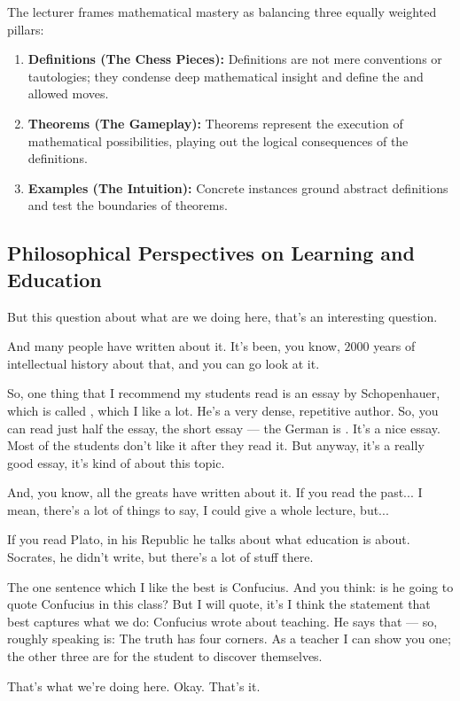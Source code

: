 \begin{content}
\begin{steps}
The lecturer frames mathematical mastery as balancing three equally weighted pillars:
\begin{enumerate}[label=\textbf{(\arabic*)}]
    \item \textbf{Definitions (The Chess Pieces):} Definitions are not mere conventions or tautologies; they condense deep mathematical insight and define the  and allowed moves.
    \item \textbf{Theorems (The Gameplay):} Theorems represent the execution of mathematical possibilities, playing out the logical consequences of the definitions.
    \item \textbf{Examples (The Intuition):} Concrete instances ground abstract definitions and test the boundaries of theorems.
\end{enumerate}
\end{steps}
\end{content}

\subsection{Philosophical Perspectives on Learning and Education}

\begin{speech}[00:41:34 - 00:43:02]
But this question about what are we doing here, that's an interesting question.

And many people have written about it. It's been, you know, $2000$ years of intellectual history about that, and you can go look at it.

So, one thing that I recommend my students read is an essay by Schopenhauer, which is called , which I like a lot. He's a very dense, repetitive author. So, you can read just half the essay, the short essay --- the German is . It's a nice essay. Most of the students don't like it after they read it. But anyway, it's a really good essay, it's kind of about this topic.

And, you know, all the greats have written about it. If you read the past... I mean, there's a lot of things to say, I could give a whole lecture, but...

If you read Plato, in his Republic he talks about what education is about. Socrates, he didn't write, but there's a lot of stuff there.

The one sentence which I like the best is Confucius. And you think: is he going to quote Confucius in this class? But I will quote, it's I think the statement that best captures what we do: Confucius wrote about teaching. He says that --- so, roughly speaking is: The truth has four corners. As a teacher I can show you one; the other three are for the student to discover themselves.

That's what we're doing here. Okay. That's it.
\end{speech}

